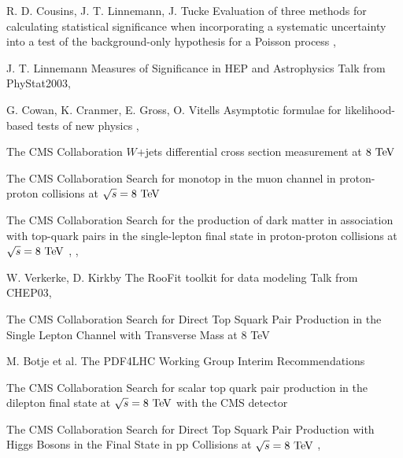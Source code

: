 {R. D. Cousins, J. T. Linnemann, J. Tucke}
{Evaluation of three methods for calculating
statistical significance when incorporating a
systematic uncertainty into a test of the
background-only hypothesis for a Poisson
process}
{, }

{J. T. Linnemann}
{Measures of Significance in HEP and Astrophysics}
{Talk from PhyStat2003, }

{G. Cowan, K. Cranmer, E. Gross, O. Vitells}
{Asymptotic formulae for likelihood-based tests of new physics}
{, }


{The CMS Collaboration}
{$W$+jets differential cross section measurement at $8~\text{TeV}$}
{}

{The CMS Collaboration}
{Search for monotop in the muon channel in proton-proton collisions at $\sqrt{s} = 8~\text{TeV}$}
{}

{The CMS Collaboration}
{Search for the production of dark matter in association with top-quark pairs
in the single-lepton final state in proton-proton collisions at $\sqrt{s} = 8~\text{TeV}$}
{, , }

{W. Verkerke, D. Kirkby}
{The RooFit toolkit for data modeling}
{Talk from CHEP03, }


{The CMS Collaboration}
{Search for Direct Top Squark Pair Production in the Single Lepton Channel
with Transverse Mass at 8 TeV}
{}

{M. Botje et al.}
{The PDF4LHC Working Group Interim Recommendations}
{}


{The CMS Collaboration}
{Search for scalar top quark pair production in the dilepton
final state at $\sqrt{s} = 8~\text{TeV}$ with the CMS detector}
{}

{The CMS Collaboration}
{Search for Direct Top Squark Pair Production with Higgs Bosons in the Final
State in pp Collisions at $\sqrt{s} = 8~\text{TeV}$}
{, }

